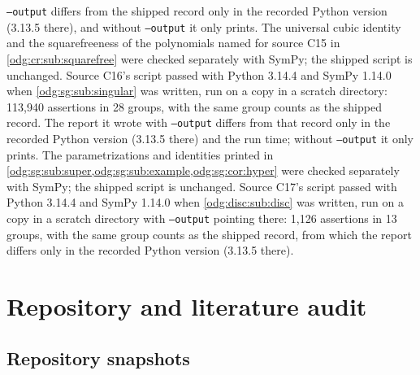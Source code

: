 \documentclass[11pt,oneside]{article}
\numberwithin{equation}{section}
\theoremstyle{definition}
\theoremstyle{remark}
\begin{document}
\texttt{--output} differs from the shipped record only in the recorded Python version
(3.13.5 there), and without \texttt{--output} it only prints. The universal cubic identity
and the squarefreeness of the polynomials named for source C15 in
\cref{odg:cr:sub:squarefree} were checked separately with SymPy; the shipped script is
unchanged. Source C16's script passed with Python 3.14.4 and SymPy 1.14.0 when
\cref{odg:sg:sub:singular} was written, run on a copy in a scratch directory: 113,940
assertions in 28 groups, with the same group counts as the shipped record. The report it
wrote with \texttt{--output} differs from that record only in the recorded Python version
(3.13.5 there) and the run time; without \texttt{--output} it only prints. The
parametrizations and identities printed in
\cref{odg:sg:sub:super,odg:sg:sub:example,odg:sg:cor:hyper} were checked separately with
SymPy; the shipped script is unchanged. Source C17's script passed with Python 3.14.4 and
SymPy 1.14.0 when \cref{odg:disc:sub:disc} was written, run on a copy in a scratch
directory with \texttt{--output} pointing there: 1,126 assertions in 13 groups, with the
same group counts as the shipped record, from which the report differs only in the recorded
Python version (3.13.5 there).

\section{Repository and literature audit}\label{odg:app:repo}\label{odg:app:audit}

\subsection{Repository snapshots}
\end{document}

